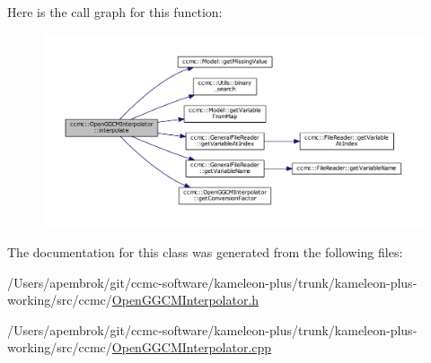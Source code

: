 Here is the call graph for this function\-:\nopagebreak
\begin{figure}[H]
\begin{center}
\leavevmode
\includegraphics[width=350pt]{classccmc_1_1_open_g_g_c_m_interpolator_ad7edc3f7862deda978513f923fc30c33_cgraph}
\end{center}
\end{figure}




The documentation for this class was generated from the following files\-:\begin{DoxyCompactItemize}
\item 
/\-Users/apembrok/git/ccmc-\/software/kameleon-\/plus/trunk/kameleon-\/plus-\/working/src/ccmc/\hyperlink{_open_g_g_c_m_interpolator_8h}{Open\-G\-G\-C\-M\-Interpolator.\-h}\item 
/\-Users/apembrok/git/ccmc-\/software/kameleon-\/plus/trunk/kameleon-\/plus-\/working/src/ccmc/\hyperlink{_open_g_g_c_m_interpolator_8cpp}{Open\-G\-G\-C\-M\-Interpolator.\-cpp}\end{DoxyCompactItemize}
